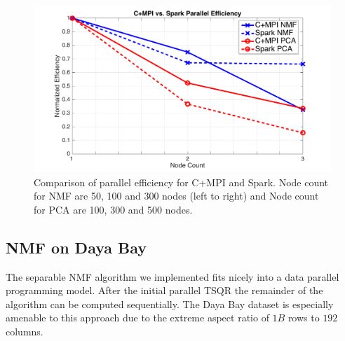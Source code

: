 \begin{figure}[t]
\includegraphics[width=.5\textwidth]{fig/peff.png}
\caption{Comparison of parallel efficiency for C+MPI and Spark. Node count for NMF are 50, 100 and 300 nodes (left to right) and Node count for PCA are 100, 300 and 500 nodes.}
\label{fig:peff}
\end{figure}

\subsection{NMF on Daya Bay}
The separable NMF algorithm we implemented fits nicely into a data parallel programming model. After the initial parallel TSQR the remainder of the algorithm can be computed sequentially. The Daya Bay dataset is especially amenable to this approach due to the extreme aspect ratio of $1B$ rows to $192$ columns.
